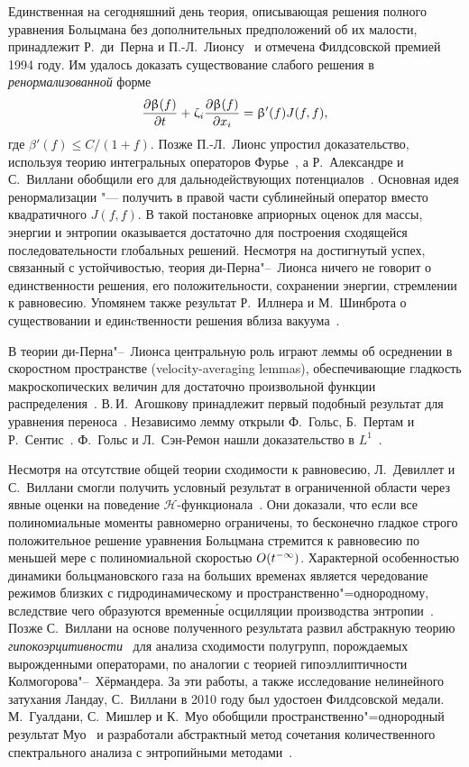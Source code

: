 Единственная на сегодняшний день теория, описывающая решения полного уравнения Больцмана без
дополнительных предположений об их малости, принадлежит Р.~ди~Перна и П.-Л.~Лионсу~\cite{Lions1989}
и отмечена Филдсовской премией 1994 году.
Им удалось доказать существование слабого решения в \emph{ренормализованной} форме
\begin{equation*}
    \pder[\beta(f)]{t} + \zeta_i\pder[\beta(f)]{x_i} = \beta'(f)J(f,f),
\end{equation*}
где \(\beta'(f) \leq C/(1+f)\).
Позже П.-Л.~Лионс упростил доказательство, используя теорию интегральных операторов Фурье~\cite{Lions1994},
а Р.~Александре и С.~Виллани обобщили его для дальнодействующих потенциалов~\cite{Alexandre2002}.
Основная идея ренормализации "--- получить в правой части сублинейный оператор вместо квадратичного \(J(f,f)\).
В такой постановке априорных оценок для массы, энергии и энтропии оказывается достаточно
для построения сходящейся последовательности глобальных решений.
Несмотря на достигнутый успех, связанный с устойчивостью, теория ди-Перна"--~Лионса ничего не говорит о
единственности решения, его положительности, сохранении энергии, стремлении к равновесию.
Упомянем также результат Р.~Иллнера и М.~Шинброта о существовании и единcтвенности решения вблиза вакуума~\cite{Illner1984}.

В теории ди-Перна"--~Лионса центральную роль играют леммы об осреднении в скоростном пространстве (velocity-averaging lemmas),
обеспечивающие гладкость макроскопических величин для достаточно произвольной функции распределения~\cite{Sentis1988}.
В.\,И.~Агошкову принадлежит первый подобный результат для уравнения переноса~\cite{Agoshkov1984}.
Независимо лемму открыли Ф.~Гольс, Б.~Пертам и Р.~Сентис~\cite{Sentis1985}.
Ф.~Гольс и Л.~Сэн-Ремон нашли доказательство в \(L^1\)~\cite{Raymond2002}.

Несмотря на отсутствие общей теории сходимости к равновесию,
Л.~Девиллет и С.~Виллани смогли получить условный результат в ограниченной области
через явные оценки на поведение \(\mathcal{H}\)-функционала~\cite{Villani2005}.
Они доказали, что если все полиномиальные моменты равномерно ограничены,
то бесконечно гладкое строго положительное решение уравнения Больцмана стремится к равновесию
по меньшей мере с полиномиальной скоростью \(\OO{t^{-\infty}}\).
Характерной особенностью динамики больцмановского газа на больших временах является чередование режимов
близких с гидродинамическому и пространственно"=однородному, вследствие чего
образуются временн\'{ы}е осцилляции производства энтропии~\cite{Filbet2006}.
Позже С.~Виллани на основе полученного результата развил абстракную теорию \emph{гипокоэрцитивности}~\cite{Villani2009}
для анализа сходимости полугрупп, порождаемых вырожденными операторами,
по аналогии с теорией гипоэллиптичности Колмогорова"--~Хёрмандера.
За эти работы, а также исследование нелинейного затухания Ландау, С.~Виллани в 2010 году был удостоен Филдсовской медали.
М.~Гуалдани, С.~Мишлер и К.~Муо обобщили пространственно"=однородный результат Муо~\cite{Mouhot2006}
и разработали абстрактный метод сочетания количественного спектрального анализа с энтропийными методами~\cite{Gualdani2013}.

